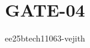 \documentclass[journal]{IEEEtran}
\begin{document}

\vspace{3cm}

\title{GATE-04}
\author{ee25btech11063-vejith}

\maketitle
{\let\newpage\relax\maketitle}
\renewcommand{\thefigure}{\theenumi}
\renewcommand{\thetable}{\theenumi}
\setlength{\intextsep}{10pt} %
\end{document}
